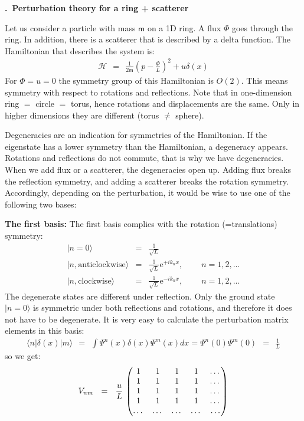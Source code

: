 \documentclass[onecolumn,fleqn, 11pt]{revtex4}
\newcommand{\eexp}{\mathrm{e}^}
\newcommand{\mass}{\mathsf{m}}
\newcommand{\amatrix}[1]{\begin{matrix} #1 \end{matrix}}
\newcommand{\beq}{\begin{eqnarray}}
\newcommand{\eeq}{\end{eqnarray}}
\renewcommand{\thesubsection}{\arabic{subsection}}
\renewcommand{\thesubsubsection}{\arabic{subsubsection}}
\newcommand{\sheadC}[1]
{
\addtocounter{subsubsection}{1}
\vspace{5mm}
{\bf \thesubsection.\thesubsubsection \ #1}  
\nopagebreak
\phantomsection
}
\begin{document}
\sheadC{Perturbation theory for a ring + scatterer}

Let us consider a particle with mass $\mass$ 
on a 1D ring. A flux ${\Phi}$ goes through the ring. 
In addition, there is a scatterer that is described 
by a delta function. The Hamiltonian that 
describes the system is:
\beq
\mathcal{H} \ \ = \ \ \frac{1}{2\mass}\left(p-\frac{\Phi}{L}\right)^2 +u\delta(x) 
\eeq
For $\Phi=u=0$  the symmetry group of this Hamiltonian is ${O(2)}$. 
This means symmetry with respect to rotations and reflections. 
Note that in one-dimension ring $=$ circle $=$ torus, 
hence rotations and displacements are the same. 
Only in higher dimensions they are different (torus ${\ne}$ sphere). 

Degeneracies are an indication for symmetries of the 
Hamiltonian. If the eigenstate has a lower symmetry 
than the Hamiltonian, a degeneracy appears. Rotations 
and reflections do not commute, that is why we have degeneracies. 
When we add flux or a scatterer, the degeneracies open up. 
Adding flux breaks the reflection symmetry, 
and adding a scatterer breaks the rotation symmetry. 
Accordingly, depending on the perturbation, 
it would be wise to use one of the following two bases:



{\bf The first basis:} 
The first basis complies with the rotation (=translations) symmetry:
\beq
|n=0\rangle &=& \frac{1}{\sqrt{L}}
\\ \nonumber
| n, \mbox{anticlockwise} \rangle &=& \frac{1}{\sqrt{L}} \eexp{+ik_n x}, \ \ \ \ \ \ \ \ \ \ n=1,2,...
\\ \nonumber
|n,\mbox{clockwise} \rangle &=& \frac{1}{\sqrt{L}} \eexp{-ik_n x}, \ \ \ \ \ \ \ \ \ \ n=1,2,...
\eeq
The degenerate states are different under reflection. 
Only the ground state ${|n=0\rangle}$ is symmetric
under both reflections and rotations, and therefore it 
does not have to be degenerate. 
It is very easy to calculate the perturbation matrix 
elements in this basis:
\beq
\langle n |\delta(x)|m \rangle 
\ \ = \ \  \int\Psi^n(x)\delta(x)\Psi^m(x)dx = \Psi^n(0)\Psi^m(0) 
\ \ = \ \ \frac{1}{L} 
\eeq
so we get:
\beq
V_{nm} \ \ = \ \ \frac{u}{L} \, 
\left(
\amatrix{
1 & 1 & 1 & 1 & \dots \cr 
1 &1& 1 &1 & \dots \cr
1 & 1 & 1 & 1 & \dots \cr 
1 & 1 & 1 & 1 & \dots \cr 
\dots & \dots & \dots & \dots & \dots } 
\right)  
\eeq
\end{document}
